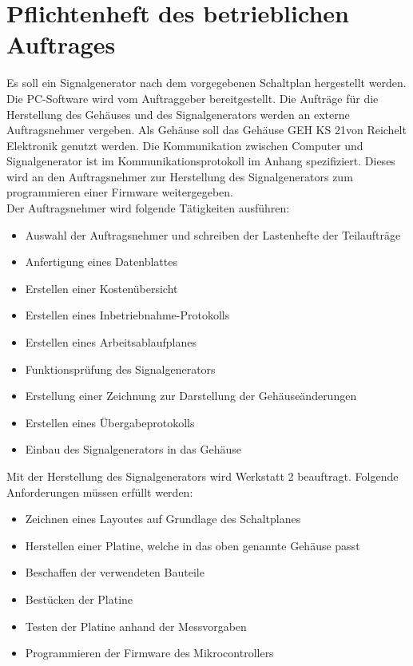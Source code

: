 \section[Pflichtenheft betriebl. Auftrag]{Pflichtenheft des betrieblichen Auftrages}
Es soll ein Signalgenerator nach dem vorgegebenen Schaltplan hergestellt werden. Die PC-Software wird vom Auftraggeber bereitgestellt. Die Aufträge für die Herstellung des Gehäuses und des Signalgenerators werden an externe Auftragsnehmer vergeben. Als Gehäuse soll das Gehäuse \glqq GEH KS 21\grqq von Reichelt Elektronik genutzt werden. Die Kommunikation zwischen Computer und Signalgenerator ist im Kommunikationsprotokoll im Anhang spezifiziert. Dieses wird an den Auftragsnehmer zur Herstellung des Signalgenerators zum programmieren einer Firmware weitergegeben.\\
\bigskip
Der Auftragsnehmer wird folgende Tätigkeiten ausführen:
\begin{itemize}
\item Auswahl der Auftragsnehmer und schreiben der Lastenhefte der Teilaufträge
\item Anfertigung eines Datenblattes
\item Erstellen einer Kostenübersicht
\item Erstellen eines Inbetriebnahme-Protokolls
\item Erstellen eines Arbeitsablaufplanes
\item Funktionsprüfung des Signalgenerators
\item Erstellung einer Zeichnung zur Darstellung der Gehäuseänderungen
\item Erstellen eines Übergabeprotokolls
\item Einbau des Signalgenerators in das Gehäuse
\end{itemize}
\bigskip
Mit der Herstellung des Signalgenerators wird Werkstatt 2 beauftragt. Folgende Anforderungen müssen erfüllt werden:\\
\begin{itemize}
\item Zeichnen eines Layoutes auf Grundlage des Schaltplanes
\item Herstellen einer Platine, welche in das oben genannte Gehäuse passt
\item Beschaffen der verwendeten Bauteile
\item Bestücken der Platine
\item Testen der Platine anhand der Messvorgaben
\item Programmieren der Firmware des Mikrocontrollers
\end{itemize}
